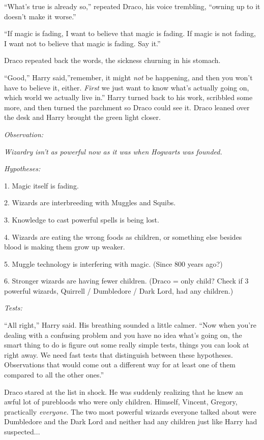 ``What's true is already so,'' repeated Draco, his voice trembling,
``owning up to it doesn't make it worse.''

``If magic is fading, I want to believe that magic is fading. If magic
is not fading, I want not to believe that magic is fading. Say it.''

Draco repeated back the words, the sickness churning in his stomach.

``Good,'' Harry said,''remember, it might \emph{not} be happening, and
then you won't have to believe it, either. \emph{First} we just want to
know what's actually going on, which world we actually live in.'' Harry
turned back to his work, scribbled some more, and then turned the
parchment so Draco could see it. Draco leaned over the desk and Harry
brought the green light closer.

\emph{Observation:}

\emph{Wizardry isn't as powerful now as it was when Hogwarts was
founded.}

\emph{Hypotheses:}

1. Magic itself is fading.

2. Wizards are interbreeding with Muggles and Squibs.

3. Knowledge to cast powerful spells is being lost.

4. Wizards are eating the wrong foods as children, or something else
besides blood is making them grow up weaker.

5. Muggle technology is interfering with magic. (Since 800 years ago?)

6. Stronger wizards are having fewer children. (Draco = only child?
Check if 3 powerful wizards, Quirrell / Dumbledore / Dark Lord, had any
children.)

\emph{Tests:}

``All right,'' Harry said. His breathing sounded a little calmer. ``Now
when you're dealing with a confusing problem and you have no idea what's
going on, the smart thing to do is figure out some really simple tests,
things you can look at right away. We need fast tests that distinguish
between these hypotheses. Observations that would come out a different
way for at least one of them compared to all the other ones.''

Draco stared at the list in shock. He was suddenly realizing that he
knew an awful lot of purebloods who were only children. Himself,
Vincent, Gregory, practically \emph{everyone.} The two most powerful
wizards everyone talked about were Dumbledore and the Dark Lord and
neither had any children just like Harry had suspected...

